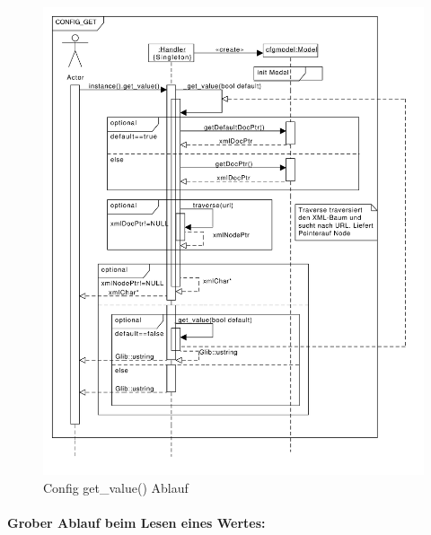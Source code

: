 \begin{figure}[htb!]
    \centering
    \includegraphics[scale=0.5]{./gfx/seq/config_get}
    \caption{Config get\_value() Ablauf}
    \label{c_configget}
\end{figure}



\paragraph{Grober Ablauf beim Lesen eines Wertes:}

